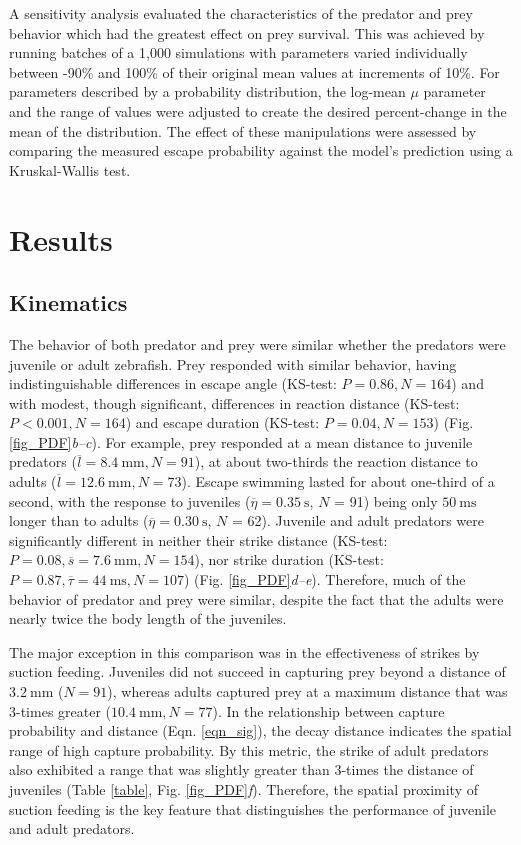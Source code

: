 \documentclass[]{rsos}%
\begin{document}
A sensitivity analysis evaluated the characteristics of the predator and prey behavior which had the greatest effect on prey survival. 
This was achieved by running batches of a 1,000 simulations with parameters varied individually between -90\% and 100\% of their original mean values at increments of 10\%.
For parameters described by a probability distribution, the log-mean $\mu$ parameter and the range of values were adjusted to create the desired percent-change in the mean of the distribution.
The effect of these manipulations were assessed by comparing the measured escape probability against the model's prediction using a Kruskal-Wallis test. 



\section{Results} %

\subsection{Kinematics} %
The behavior of both predator and prey were similar whether the predators were juvenile or adult zebrafish.
Prey responded with similar behavior, having indistinguishable differences in escape angle (KS-test: $P = 0.86, N = 164$) and with modest, though significant, differences in reaction distance (KS-test: $P < 0.001, N = 164$) and escape duration (KS-test: $P = 0.04, N = 153$) (Fig. \ref{fig_PDF}\textit{b--c}). 
For example, prey responded at a mean distance to juvenile predators ($\overline{l} = \SI{8.4}{\mm}, N = 91$), at about two-thirds the reaction distance to adults ($\overline{l} = \SI{12.6}{\mm}, N = 73$).
Escape swimming lasted for about one-third of a second, with the response to juveniles ($\overline{\eta} = \SI{0.35}{\s}$, $N$ = 91) being only  $\SI{50}{\ms}$ longer than to adults ($\overline{\eta} = \SI{0.30}{\s}$, $N$ = 62).
Juvenile and adult predators were significantly different in neither their strike distance (KS-test: $P = 0.08, \overline{s} = \SI{7.6}{\mm}, N = 154$), nor strike duration (KS-test: $P = 0.87, \overline{\tau} = \SI{44}{\ms}, N = 107$) (Fig. \ref{fig_PDF}\textit{d--e}).
Therefore, much of the behavior of predator and prey were similar, despite the fact that the adults were nearly twice the body length of the juveniles.

The major exception in this comparison was in the effectiveness of strikes by suction feeding.
Juveniles did not succeed in capturing prey beyond a distance of $\SI{3.2}{\mm}$ ($N = 91$), whereas adults captured prey at a maximum distance that was 3-times greater ($\SI{10.4}{\mm}, N = 77$).
In the relationship between capture probability and distance (Eqn. \ref{eqn_sig}), the decay distance indicates the spatial range of high capture probability. 
By this metric, the strike of adult predators also exhibited a range that was slightly greater than 3-times the distance of juveniles (Table \ref{table}, Fig. \ref{fig_PDF}\textit{f}).
Therefore, the spatial proximity of suction feeding is the key feature that distinguishes the performance of juvenile and adult predators.
\end{document}
